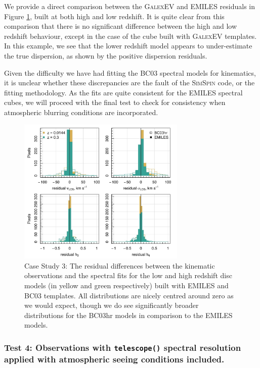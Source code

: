 \documentclass[
  journal=pasa,
  manuscript=research-paper, %
  year=2020,
  volume=37,
]{cup-journal}
\newcommand{\simspin}[1]{\textsc{SimSpin}#1} %
\newcommand{\telescope}[1]{\texttt{telescope()}#1}
\begin{document}
We provide a direct comparison between the \textsc{GalexEV} and EMILES residuals in Figure \ref{fig:cs3_hist}, built at both high and low redshift.
It is quite clear from this comparison that there is no significant difference between the high and low redshift behaviour, except in the case of the cube built with \textsc{GalexEV} templates.
In this example, we see that the lower redshift model appears to under-estimate the true dispersion, as shown by the positive dispersion residuals. 

Given the difficulty we have had fitting the BC03 spectral models for kinematics, it is unclear whether these discrepancies are the fault of the \simspin{} code, or the fitting methodology. 
As the fits are quite consistent for the EMILES spectral cubes, we will proceed with the final test to check for consistency when atmospheric blurring conditions are incorporated. 

\begin{figure}
    \centering
    \includegraphics[keepaspectratio, width=8cm]{Figures/cs3_histograms.jpeg}
    \caption{Case Study 3: The residual differences between the kinematic observations and the spectral fits for the low and high redshift disc models (in yellow and green respectively) built with EMILES and BC03 templates. All distributions are nicely centred around zero as we would expect, though we do see significantly broader distributions for the BC03hr models in comparison to the EMILES models.}
    \label{fig:cs3_hist}
\end{figure}

\subsubsection*{Test 4: Observations with \telescope{} spectral resolution applied with atmospheric seeing conditions included. \\ }
\end{document}
